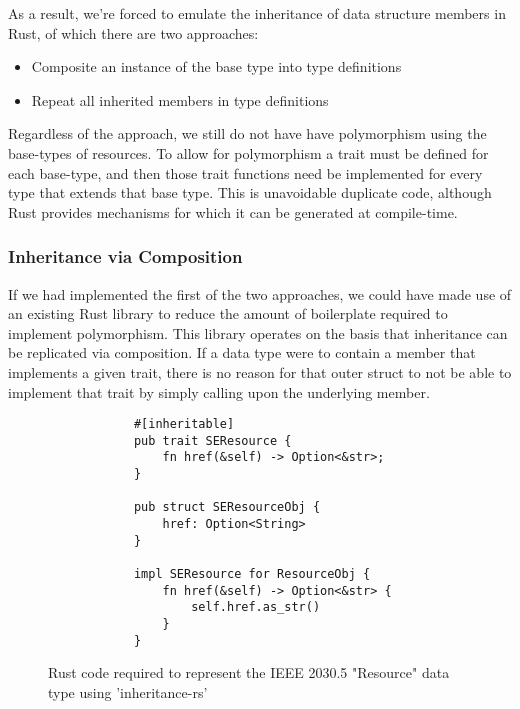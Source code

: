 As a result, we're forced to emulate the inheritance of data structure members in Rust, of which there are two approaches:

\begin{itemize}
    \item Composite an instance of the base type into type definitions 
    \item Repeat all inherited members in type definitions
\end{itemize}

Regardless of the approach, we still do not have have polymorphism using the base-types of resources.
To allow for polymorphism a trait must be defined for each base-type, and then those trait functions need be implemented for every type that extends that base type. 
This is unavoidable duplicate code, although Rust provides mechanisms for which it can be generated at compile-time.

\subsubsection{Inheritance via Composition}

If we had implemented the first of the two approaches, we could have made use of an existing Rust library to reduce the amount of boilerplate required to implement polymorphism.
This library operates on the basis that inheritance can be replicated via composition. If a data type were to contain a member that implements a given trait, there is no reason for that outer struct to not be able to implement that trait by simply calling upon the underlying member.


\begin{figure}[H]
    \begin{center}
        \begin{lstlisting}
            #[inheritable]
            pub trait SEResource {
                fn href(&self) -> Option<&str>;
            }

            pub struct SEResourceObj {
                href: Option<String>
            }

            impl SEResource for ResourceObj {
                fn href(&self) -> Option<&str> {
                    self.href.as_str()
                }
            }
        \end{lstlisting}
        \label{fig:resinher}
        \caption{Rust code required to represent the IEEE 2030.5 "Resource" data type using 'inheritance-rs'}
    \end{center}
\end{figure}

